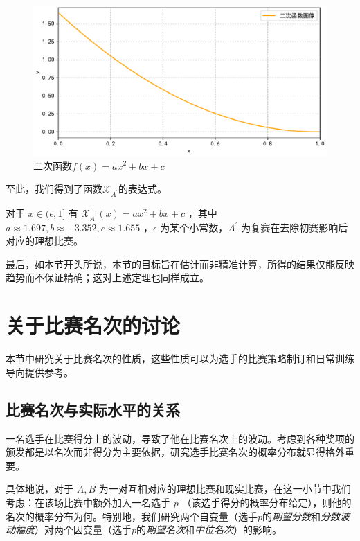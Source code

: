         \begin{figure}[htbp]
            \centering
            \includegraphics[width=\textwidth]{fig/plottingQuadFuncOfXAprime.pdf}
            \caption{二次函数$f(x)=ax^2+bx+c$}
            \label{fig:quadFuncOfXAprime}
        \end{figure}

        至此，我们得到了函数$\mathcal{X}_{A^\prime}$的表达式。

        \begin{theorem}
            对于 $x\in(\epsilon,1]$ 有 $\mathcal{X}_{A^\prime}(x)=ax^2+bx+c$ ，其中 $a\approx 1.697,b\approx -3.352,c\approx 1.655$ ，$\epsilon$ 为某个小常数，$A^\prime$ 为复赛在去除初赛影响后对应的理想比赛。

            \label{thm:formulaforXAprime}
        \end{theorem}

        最后，如本节开头所说，本节的目标旨在估计而非精准计算，所得的结果仅能反映趋势而不保证精确；这对上述定理也同样成立。

\section{关于比赛名次的讨论}

    本节中研究关于比赛名次的性质，这些性质可以为选手的比赛策略制订和日常训练导向提供参考。

    \subsection{比赛名次与实际水平的关系}

        一名选手在比赛得分上的波动，导致了他在比赛名次上的波动。考虑到各种奖项的颁发都是以名次而非得分为主要依据，研究选手比赛名次的概率分布就显得格外重要。
        
        具体地说，对于 $A,B$ 为一对互相对应的理想比赛和现实比赛，在这一小节中我们考虑：在该场比赛中额外加入一名选手 $p$ （该选手得分的概率分布给定），则他的名次的概率分布为何。特别地，我们研究两个自变量（选手$p$的\emph{期望分数}和\emph{分数波动幅度}）对两个因变量（选手$p$的\emph{期望名次}和\emph{中位名次}）的影响。

